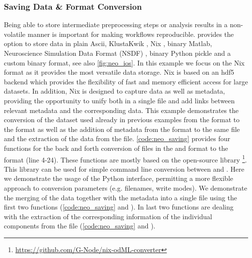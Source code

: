 \subsubsection{Saving Data \& Format Conversion}
Being able to store intermediate preprocessing steps or analysis results in a non-volatile manner is important for making workflows reproducible.  provides the option to store data in plain Ascii, KlustaKwik \citep{hazan_klusters_2006}, Nix \citep{stoewer_file_2014}, binary Matlab, Neuroscience Simulation Data Format (NSDF) \citep{ray_nsdf:_2016}, binary Python pickle and a custom binary format, see also \cref{fig:neo_ios}. In this example we focus on the Nix format as it provides the most versatile data storage. Nix is based on an hdf5 \citep{the_hdf_group_hierarchical_1997} backend which provides the flexibility of fast and memory efficient access for large datasets. In addition, Nix is designed to capture data as well as metadata, providing the opportunity to unify both in a single file and add links between relevant metadata and the corresponding data. 
This example demonstrates the conversion of the dataset used already in previous examples from the  format to the  format as well as the addition of metadata from the  format to the same file and the extraction of the data from the  file.
\cref{code:neo_saving} provides four functions for the back and forth conversion of files in the  and  format to the  format (line 4-24). These functions are mostly based on the open-source  library \footnote{\url{https://github.com/G-Node/nix-odML-converter}}. This library can be used for simple command line conversion between  and . Here we demonstrate the usage of the Python interface, permitting a more flexible approach to conversion parameters (e.g. filenames, write modes).
We demonstrate the merging of the data together with the metadata into a single  file using the first two functions (\cref{code:neo_saving}  and ). In last two functions are dealing with the extraction of the corresponding information of the individual components from the  file (\cref{code:neo_saving}  and ).

